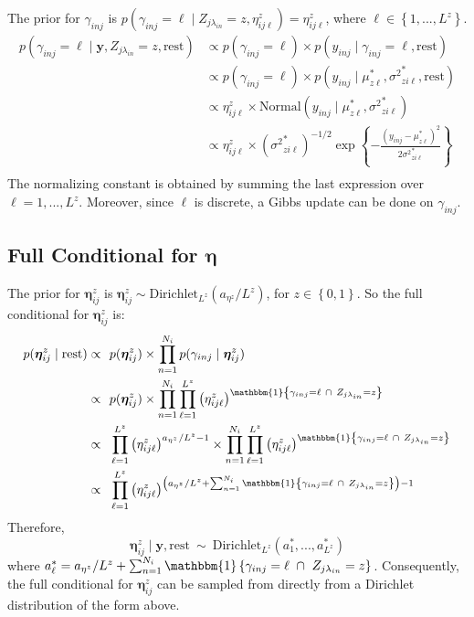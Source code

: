 \documentclass[12pt]{article}
\newcommand{\p}[1]{\left(#1\right)}
\newcommand{\bc}[1]{ \left\{#1\right\} }
\newcommand{\N}{ \mathcal{N} }
\def\N{\text{Normal}}
\def\Dir{\text{Dirichlet}}
\def\lin{\lambda_{in}}
\def\y{\bm{y}}
\def\mus{\mu^*}
\def\sss{{\sigma^2}^*}
\newcommand{\Ind}[1]{\mathbbm{1}\bc{#1}}
\def\rest{\text{rest}}
\begin{document}
The prior for $\gamma_{inj}$ is
$p(\gamma_{inj} = \ell \mid Z_{j\lin}=z, \eta^z_{ij\ell}) = \eta^z_{ij\ell}$,
where $\ell \in \bc{1,...,L^z}$.
%
\begin{align*}
p(\gamma_{inj}=\ell \mid \y, Z_{j\lin}=z, \rest) &\propto p(\gamma_{inj}=\ell) \times p(y_{inj} \mid \gamma_{inj}=\ell, \rest) \\
&\propto p(\gamma_{inj}=\ell) \times p(y_{inj} \mid \mus_{z\ell}, \sss_{zi\ell}, \rest) \\
%
&\propto \eta^z_{ij\ell} \times \N(y_{inj} \mid \mus_{z\ell}, \sss_{zi\ell}) \\
&\propto \eta^z_{ij\ell} \times (\sss_{zi\ell})^{-1/2}
\exp\bc{-\frac{(y_{inj} - \mus_{z\ell})^2}{2\sss_{zi\ell}}} \\
\end{align*}
%
The normalizing constant is obtained by summing the last expression over
$\ell = 1,...,L^z$. Moreover, since $\ell$ is discrete, a Gibbs
update can be done on $\gamma_{inj}$.

\subsection{\texorpdfstring{Full Conditional for
$\bm\eta$}{Full Conditional for \textbackslash{}bm\textbackslash{}eta}}\label{full-conditional-for-bmeta}

The prior for $\bm\eta^z_{ij}$ is
$\bm \eta^z_{ij} \sim \Dir_{L^z}(a_{\eta^z} / L^z)$, for $z\in\bc{0,1}$.
So the full conditional for $\bm\eta^z_{ij}$ is:
%
\begin{align*}
p(\bm \eta^z_{ij} \mid \rest) \propto&~~ p(\bm{\eta}^z_{ij}) \times \prod_{n=1}^{N_i} p(\gamma_{inj} \mid \bm \eta^z_{ij})\\
\propto&~~ p(\bm \eta^z_{ij}) \times \prod_{n=1}^{N_i}\prod_{\ell=1}^{L^z} \p{\eta^z_{ij\ell}}^{\Ind{ \gamma_{inj}=\ell ~\cap~ Z_{j\lin}=z}}\\
%
\propto&~~ \prod_{\ell=1}^{L^z} \p{\eta^z_{ij\ell}}^{a_{\eta^z}/L^z-1} \times 
\prod_{n=1}^{N_i}\prod_{\ell=1}^{L^z} \p{\eta^z_{ij\ell}}^{\Ind{ \gamma_{inj}=\ell ~\cap~ Z_{j\lin}=z}}\\
\propto&~~ \prod_{\ell=1}^{L^z} \p{\eta^z_{ij\ell}}^{\p{a_{\eta^z}/L^z + \sum_{n=1}^{N_i} \Ind{ \gamma_{inj}=\ell ~\cap~ Z_{j\lin}=z}} - 1}\\
%
\end{align*}
%
Therefore, $$
\bm{\eta}^z_{ij} \mid \y,\rest ~\sim~ \Dir_{L^z}\p{a^*_1,...,a^*_{L^z}}
$$ where
$a^*_\ell = a_{\eta^z}/L^z+\sum_{n=1}^{N_i}\Ind{\gamma_{inj}=\ell ~\cap~ Z_{j\lin}=z}$.
Consequently, the full conditional for $\bm{\eta}^z_{ij}$ can be
sampled from directly from a Dirichlet distribution of the form above.
\end{document}
